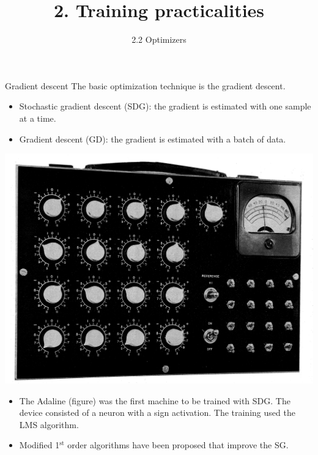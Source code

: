 \documentclass{beamer}
\title{2. Training practicalities}
\subtitle{2.2 Optimizers}
\begin{document}
\maketitle

\begin{frame}{Gradient descent}
The basic optimization technique is the gradient descent. 
\begin{itemize}
    \item Stochastic gradient descent (SDG): the gradient is estimated with one sample at a time.
    \item Gradient descent (GD):  the gradient is estimated with a batch of data.  
\end{itemize}
\begin{multicols}{2}
\includegraphics[scale=0.05]{Module 1 (NN)/pics/adaline.pdf}

\columnbreak
\begin{itemize}
\item The Adaline (figure) was the first machine to be trained with SDG. The device consisted of a neuron with a sign activation. The training used the LMS algorithm.

\item Modified 1$^\text{st}$ order algorithms have been proposed that improve the SG.

\end{itemize}
\end{multicols}
\end{frame}
\end{document}
